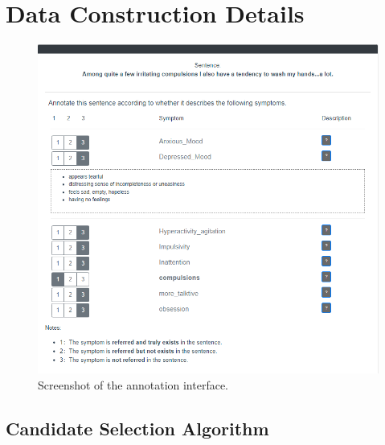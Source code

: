 \section{Data Construction Details}

\begin{figure}[ht]
    \centering
    \includegraphics[width=1.8\columnwidth]{figures/anno_interface.png}
    \caption{Screenshot of the annotation interface.}
    \label{fig:anno_interface}
\end{figure}

\subsection{Candidate Selection Algorithm}
\label{apd:cand}

